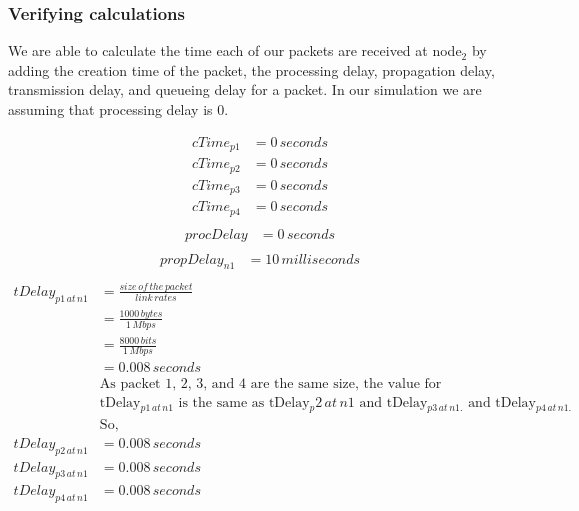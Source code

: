\documentclass[fleqn,11pt]{article}
\begin{document}
\subsubsection{Verifying calculations}
We are able to calculate the time each of our packets are received at node$_2$ by adding the creation time of the packet, the processing delay, propagation delay, transmission delay, and queueing delay for a packet. In our simulation we are assuming that processing delay is 0. 

\begin{align*}
cTime_{p1} &= 0\,seconds\\
cTime_{p2} &= 0\,seconds\\
cTime_{p3} &= 0\,seconds\\
cTime_{p4} &= 0\,seconds\\
\end{align*}
\begin{align*}
procDelay &= 0\,seconds\\
\end{align*}
\begin{align*}
propDelay_{n1} &= 10\,milliseconds\\
\end{align*}
\begin{align*}
tDelay_{p1\,at\,n1} &=  \frac{size\,of\,the\,packet} {link\,rates}\\
&= \frac{1000\,bytes} {1\,Mbps}\\
&=  \frac{8000\,bits} {1\,Mbps}\\
&= 0.008 \,seconds\\
&\text{As packet 1, 2, 3, and 4 are the same size, the value for}\\
&\text{tDelay$_{p1\,at\,n1}$ is the same as tDelay${_p2\,at\,n1}$ and tDelay$_{p3\,at\,n1.}$ and  tDelay$_{p4\,at\,n1.}$}\\
&\text{So,}\\
tDelay_{p2\,at\,n1} &=  0.008 \,seconds\\
tDelay_{p3\,at\,n1} &=  0.008 \,seconds\\
tDelay_{p4\,at\,n1} &=  0.008 \,seconds\\
\end{align*}
\end{document}
